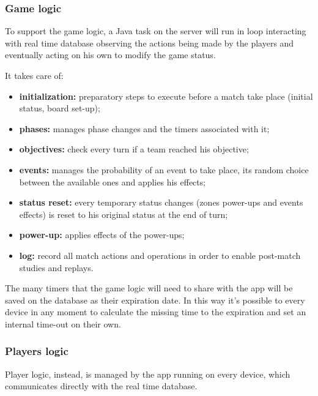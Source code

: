 			\subsubsection{Game logic}
			
				To support the game logic, a Java task on the server will run in loop interacting with real time database observing the actions being made by the players and eventually acting on his own to modify the game status.
				
				It takes care of:
				\begin{itemize}
					\item \textbf{initialization:} preparatory steps to execute before a match take place (initial status, board set-up);
					\item \textbf{phases:} manages phase changes and the timers associated with it;
					\item \textbf{objectives:} check every turn if a team reached his objective;
					\item \textbf{events:} manages the probability of an event to take place, its random choice between the available ones and applies his effects;
					\item \textbf{status reset:} every temporary status changes (zones power-ups and events effects) is reset to his original status at the end of turn;
					\item \textbf{power-up:} applies effects of the power-ups;
					\item \textbf{log:} record all match actions and operations in order to enable post-match studies and replays.  
				\end{itemize}
				
				The many timers that the game logic will need to share with the app will be saved on the database as their expiration date. In this way it's possible to every device in any moment to calculate the missing time to the expiration and set an internal time-out on their own.
			
			\subsubsection{Players logic}
			
				Player logic, instead, is managed by the app running on every device, which communicates directly with the real time database.
				

